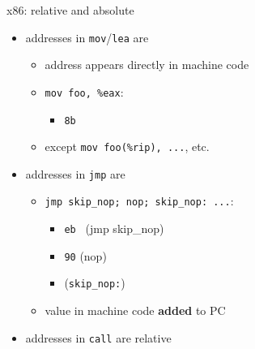 \begin{frame}[fragile,label=relAndAbs]{x86: relative and absolute}
    \begin{itemize}
    \item addresses in {\tt mov}/{\tt lea} are 
        \begin{itemize}
        \item address appears directly in machine code
        \item \lstinline|mov foo, %eax|: 
            \begin{itemize}
            \item {\tt 8b \color{blue!70!black}{04 25 \normalfont(address of foo)}}
            \end{itemize}
        \item except \lstinline|mov foo(%rip), ...|, etc.
        \end{itemize}
    \item addresses in {\tt jmp} are 
        \begin{itemize}
        \item \lstinline|jmp skip_nop; nop; skip_nop: ...|:
            \begin{itemize}
            \item {\tt eb \color{blue!70!black}{01}} (jmp skip\_nop)
            \item {\tt 90} (nop)
            \item ({\tt skip\_nop:})
            \end{itemize}
        \item value in machine code \textbf{added} to PC
        \end{itemize}
    \item addresses in {\tt call} are relative
    \end{itemize}
\end{frame}

